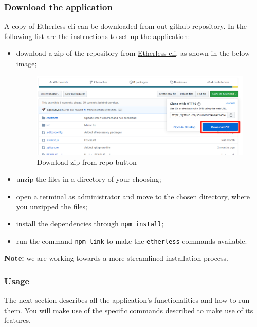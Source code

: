     \subsubsection{Download the application}
      A copy of Etherless-cli can be downloaded from out github repository. In the following list are the instructions to set up the application:
      \begin{itemize}
        \item download a zip of the repository from \href{https://github.com/RoundaboutTeam/etherless-cli/tree/master}{Etherless-cli}, as shown in the below image;
        \begin{figure}[H]
    			\centering
    			\includegraphics[width=1.1\textwidth]{./res/img/down_zip_repo.png}
    			\caption{Download zip from repo button}
    		\end{figure}
        \item unzip the files in a directory of your choosing;
        \item open a terminal as administrator and move to the chosen directory, where you unzipped the files;
        \item install the dependencies through \texttt{npm install};
        \item run the command \texttt{npm link} to make the \texttt{etherless} commands available.
      \end{itemize}
      \textbf{Note:} we are working towards a more streamlined installation process.
    \subsubsection{Usage}
      The next section describes all the application's functionalities and how to run them. You will make use of the specific commands described to make use of its features.
